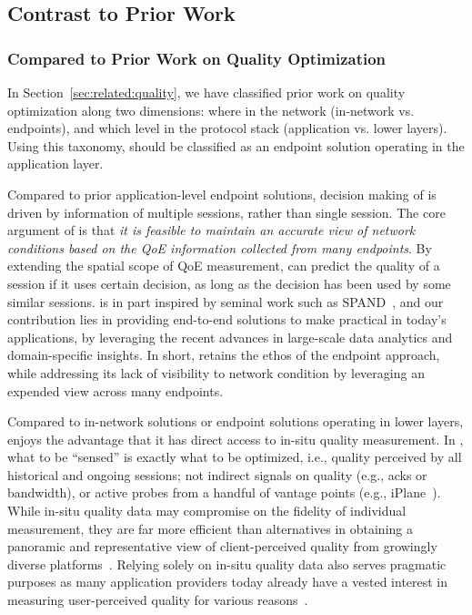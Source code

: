 \subsection{Contrast to Prior Work}
\label{subsec:overview:contrast}

\subsubsection{Compared to Prior Work on Quality Optimization}

In Section~\ref{sec:related:quality}, we have classified
prior work on quality optimization along two dimensions:
where in the network (in-network vs. endpoints), and
which level in the protocol stack (application vs. lower layers).
Using this taxonomy, \ddn should be classified as an 
endpoint solution operating in the application layer.


Compared to prior application-level endpoint solutions,
decision making of \ddn is driven by information of multiple sessions, 
rather than single session. 
The core argument of \ddn is that {\em it is feasible to
maintain an accurate view of network conditions based on the QoE information
collected from many endpoints}.
By extending the spatial scope of QoE measurement, 
\ddn can predict the quality of a session if it uses certain decision, 
as long as the decision has been used by 
some similar sessions.
\ddn is in part inspired by seminal work such as SPAND~\cite{spand},
and our contribution lies in providing end-to-end solutions to make \ddn
practical in today's applications, by leveraging the recent advances
in large-scale data analytics and domain-specific insights.
In short, \ddn retains the ethos of the endpoint approach, 
while addressing its lack of
visibility to network condition by leveraging an expended view 
across many endpoints.

Compared to in-network solutions or endpoint solutions operating 
in lower layers, \ddn enjoys the advantage that it has  
direct access to in-situ quality measurement.
In \ddn, what to be ``sensed'' is exactly what to be optimized, 
i.e., quality perceived by all historical and ongoing sessions; 
not indirect signals on quality (e.g., acks 
or bandwidth), or active probes from a handful 
of vantage points (e.g., iPlane~\cite{iplaneosdi}). 
While in-situ quality data may compromise on the fidelity of 
individual measurement, they are far more efficient than 
alternatives in obtaining a panoramic and representative
 view of client-perceived quality from growingly diverse platforms~\cite{insitu}.
Relying solely on in-situ quality data also serves pragmatic 
purposes as many application providers today already have 
a vested interest in measuring user-perceived quality for 
various reasons~\cite{sigcomm-qoe-workshop}.








